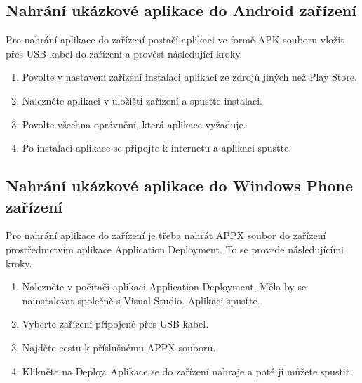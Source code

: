 \subsection{Nahrání ukázkové aplikace do Android zařízení}
Pro nahrání aplikace do zařízení postačí aplikaci ve formě APK souboru vložit přes USB kabel do zařízení a provést následující kroky.
\begin{enumerate}
\item Povolte v nastavení zařízení instalaci aplikací ze zdrojů jiných než Play Store.
\item Nalezněte aplikaci v uložišti zařízení a spusťte instalaci.
\item Povolte všechna oprávnění, která aplikace vyžaduje.
\item Po instalaci aplikace se připojte k internetu a aplikaci spusťte.
\end{enumerate}
\subsection{Nahrání ukázkové aplikace do Windows Phone zařízení}
Pro nahrání aplikace do zařízení je třeba nahrát APPX soubor do zařízení prostřednictvím aplikace Application Deployment. To se provede následujícími kroky.
\begin{enumerate}
\item Nalezněte v počítači aplikaci Application Deployment. Měla by se nainstalovat společně s Visual Studio. Aplikaci spusťte.
\item Vyberte zařízení připojené přes USB kabel.
\item Najděte cestu k příslušnému APPX souboru. 
\item Klikněte na Deploy. Aplikace se do zařízení nahraje a poté ji můžete spustit.
\end{enumerate}


